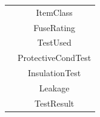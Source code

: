 \begin{center}
\begin{tabular}{|c|c|}
                               & ItemClass                        \\ 
                               & FuseRating                       \\ 
                               & TestUsed                         \\ 
                               & ProtectiveCondTest               \\ 
                               & InsulationTest                   \\ 
                               & Leakage                          \\ 
                               & TestResult                       \\ \hline
    \end{tabular}
\end{center}

\newpage

